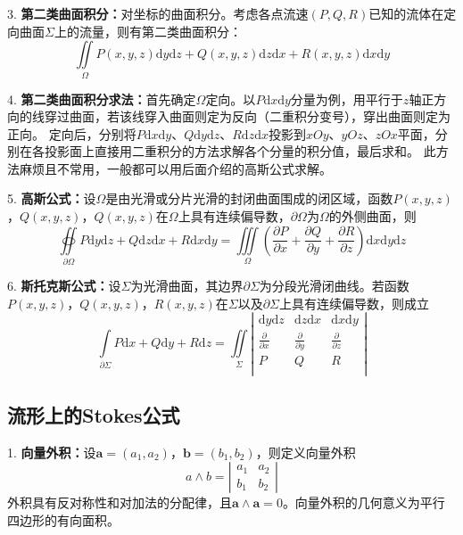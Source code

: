 3. \textbf{第二类曲面积分：}对坐标的曲面积分。考虑各点流速$\left(P,Q,R\right)$已知的流体在定向曲面$\Sigma$上的流量，则有第二类曲面积分：
\begin{equation*}
    \iint\limits_{\Omega}P(x,y,z) \mathrm{d}y\mathrm{d}z+Q(x,y,z) \mathrm{d}z\mathrm{d}x+R(x,y,z) \mathrm{d}x\mathrm{d}y
\end{equation*}

4. \textbf{第二类曲面积分求法：}首先确定$\Omega$定向。以$P\mathrm{d}x\mathrm{d}y$分量为例，用平行于$z$轴正方向的线穿过曲面，若该线穿入曲面则定为反向（二重积分变号），穿出曲面则定为正向。
定向后，分别将$P\mathrm{d}x\mathrm{d}y$、$Q\mathrm{d}y\mathrm{d}z$、$R\mathrm{d}z\mathrm{d}x$投影到$xOy$、$yOz$、$zOx$平面，分别在各投影面上直接用二重积分的方法求解各个分量的积分值，最后求和。
此方法麻烦且不常用，一般都可以用后面介绍的高斯公式求解。

5. \textbf{高斯公式：}设$\Omega$是由光滑或分片光滑的封闭曲面围成的闭区域，函数$P(x,y,z)$，$Q(x,y,z)$，$Q(x,y,z)$在$\Omega$上具有连续偏导数，$\partial \Omega$为$\Omega$的外侧曲面，则
\begin{equation*}
    \oiint\limits_{\partial \Omega}P\mathrm{d}y\mathrm{d}z+Q\mathrm{d}z\mathrm{d}x+R\mathrm{d}x\mathrm{d}y=\iiint\limits_\Omega \left(\frac{\partial P}{\partial x}+\frac{\partial Q}{\partial y}+\frac{\partial R}{\partial z}\right)\mathrm{d}x\mathrm{d}y\mathrm{d}z
\end{equation*}

6. \textbf{斯托克斯公式：}设$\Sigma$为光滑曲面，其边界$\partial \Sigma$为分段光滑闭曲线。若函数$P(x,y,z)$，$Q(x,y,z)$，$R(x,y,z)$在$\Sigma$以及$\partial \Sigma$上具有连续偏导数，则成立
\begin{equation*}
    \int\limits_{\partial \Sigma} P\mathrm{d}x+Q\mathrm{d}y+R\mathrm{d}z=\iint\limits_\Sigma \left|\begin{matrix}
        \mathrm{d}y\mathrm{d}z &\mathrm{d}z\mathrm{d}x&\mathrm{d}x\mathrm{d}y\\
        \frac{\partial }{\partial x}&\frac{\partial }{\partial y}&\frac{\partial }{\partial z}\\
        P&Q&R\\
    \end{matrix}\right|
\end{equation*}

\subsection{流形上的Stokes公式}

1. \textbf{向量外积：}设$\boldsymbol{a}=(a_1,a_2)$，$\boldsymbol{b}=(b_1,b_2)$，则定义向量外积
\begin{equation*}
    a \wedge b = \left|\begin{matrix}
        a_1&a_2\\
        b_1&b_2
    \end{matrix}\right|
\end{equation*}
外积具有反对称性和对加法的分配律，且$\boldsymbol{a}\wedge \boldsymbol{a}=0$。向量外积的几何意义为平行四边形的有向面积。

